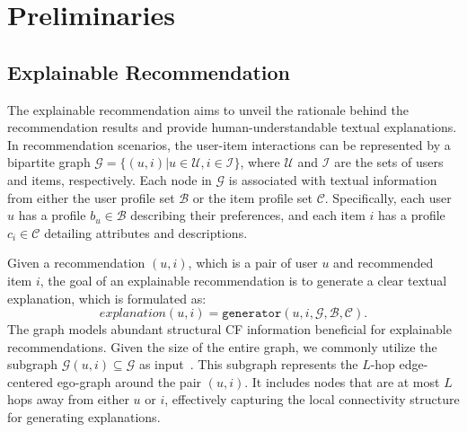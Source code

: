 \section{Preliminaries}

\subsection{Explainable Recommendation}
The explainable recommendation aims to unveil the rationale behind the recommendation results and provide human-understandable textual explanations.
%
In recommendation scenarios, the user-item interactions can be represented by a bipartite graph $\mathcal{G}=\{(u,i)|u\in\mathcal{U},i\in\mathcal{I}\}$, where $\mathcal{U}$ and $\mathcal{I}$ are the sets of users and items, respectively.
Each node in $\mathcal{G}$ is associated with textual information from either the user profile set $\mathcal{B}$ or the item profile set $\mathcal{C}$. 
Specifically, each user $u$ has a profile $b_u \in \mathcal{B}$ describing their preferences, and each item $i$ has a profile $c_i \in \mathcal{C}$ detailing attributes and descriptions. 

%
Given a recommendation $(u, i)$, which is a pair of user $u$ and recommended item $i$, the goal of an explainable recommendation is to generate a clear textual explanation, which is formulated as:
\begin{equation}
    explanation(u, i) = \texttt{generator}(u,i,\mathcal{G}, \mathcal{B}, \mathcal{C}).
\end{equation}
The graph models abundant structural CF information beneficial for explainable recommendations. Given the size of the entire graph, we commonly utilize the subgraph $\mathcal{G}{(u,i)} \subseteq \mathcal{G}$ as input~\cite{ying2018graph,zhang2023page}.
This subgraph represents the $L$-hop edge-centered ego-graph around the pair $(u, i)$.  It includes nodes that are at most $L$ hops away from either $u$ or $i$, effectively capturing the local connectivity structure for generating explanations.


